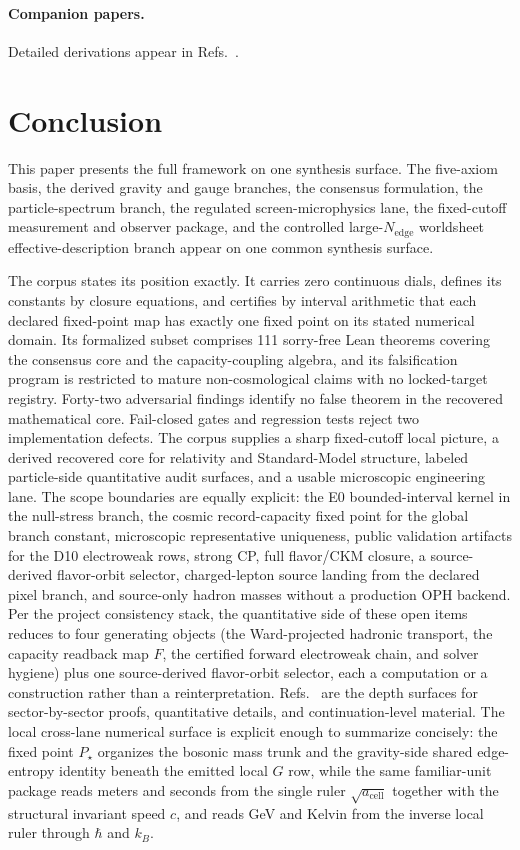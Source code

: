 \paragraph{Companion papers.}
Detailed derivations appear in Refs.~\cite{ophcompact,ophconsensus,ophmicrophysics,ophparticles,ophyangmills,ophstringselector}.

\section{Conclusion}

This paper presents the full framework on one synthesis surface. The five-axiom basis, the
derived gravity and gauge branches, the consensus formulation, the particle-spectrum branch,
the regulated screen-microphysics lane, the fixed-cutoff measurement and observer package, and the
controlled large-\(N_{\mathrm{edge}}\) worldsheet effective-description branch appear on one
common synthesis surface.

The corpus states its position exactly. It carries zero continuous dials, defines its constants
by closure equations, and certifies by interval arithmetic that each declared fixed-point map
has exactly one fixed point on its stated numerical domain. Its formalized subset comprises 111
sorry-free Lean theorems covering the consensus core and the capacity-coupling algebra, and its
falsification program is restricted to mature non-cosmological claims with no
locked-target registry. Forty-two adversarial findings identify no false theorem in the recovered
mathematical core. Fail-closed gates and regression tests reject two implementation defects. The corpus supplies a
sharp fixed-cutoff local picture, a derived recovered core for relativity and Standard-Model
structure, labeled particle-side quantitative audit surfaces, and a usable microscopic
engineering lane. The scope boundaries are equally explicit: the E0 bounded-interval kernel in the null-stress
branch, the cosmic record-capacity fixed point for the global branch constant, microscopic
representative uniqueness, public validation artifacts for the D10 electroweak rows, strong CP,
full flavor/CKM closure, a source-derived flavor-orbit selector, charged-lepton source landing from
the declared pixel branch, and source-only hadron masses
without a production OPH backend.
Per the project consistency stack, the quantitative side of these open items
reduces to four generating objects (the Ward-projected hadronic transport, the capacity readback
map \(F\), the certified forward electroweak chain, and solver hygiene) plus one source-derived
flavor-orbit selector, each a computation or a construction rather than a reinterpretation.
Refs.~\cite{ophcompact,ophconsensus,ophmicrophysics,ophparticles} are the depth surfaces for
sector-by-sector proofs, quantitative details, and continuation-level material. The local
cross-lane numerical surface is explicit enough to summarize concisely: the fixed point \(P_\star\)
organizes the bosonic mass trunk and the gravity-side shared edge-entropy identity beneath the
emitted local \(G\) row, while the same familiar-unit package reads meters and seconds from the
single ruler \(\sqrt{a_{\mathrm{cell}}}\) together with the structural invariant speed \(c\), and
reads GeV and Kelvin from the inverse local ruler through \(\hbar\) and \(k_B\).
